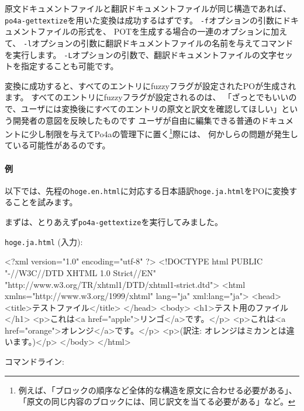 \documentclass[mingoth,a4paper]{jsarticle}
\begin{document}
原文ドキュメントファイルと翻訳ドキュメントファイルが同じ構造であれば、
\texttt{po4a-gettextize}を用いた変換は成功するはずです。
\texttt{-f}オプションの引数にドキュメントファイルの形式を、
POTを生成する場合の一連のオプションに加えて、
\texttt{-l}オプションの引数に翻訳ドキュメントファイルの名前を与えてコマンドを実行します。
\texttt{-L}オプションの引数で、翻訳ドキュメントファイルの文字セットを指定することも可能です。

変換に成功すると、すべてのエントリにfuzzyフラグが設定されたPOが生成されます。
すべてのエントリにfuzzyフラグが設定されるのは、
「ざっとでもいいので、ユーザには変換後にすべてのエントリの原文と訳文を確認してほしい」という開発者の意図を反映したものです
ユーザが自由に編集できる普通のドキュメントに少し制限を与えてPo4aの管理下に置く\footnote{例えば、「ブロックの順序など全体的な構造を原文に合わせる必要がある」、「原文の同じ内容のブロックには、同じ訳文を当てる必要がある」など。}際には、
何かしらの問題が発生している可能性があるのです。

\paragraph{例}
以下では、先程の\texttt{hoge.en.html}に対応する日本語訳\texttt{hoge.ja.html}をPOに変換することを試みます。

まずは、とりあえず\texttt{po4a-gettextize}を実行してみました。

\texttt{hoge.ja.html} (入力):

\begin{commandline}
<?xml version="1.0" encoding="utf-8" ?>
<!DOCTYPE html PUBLIC "-//W3C//DTD XHTML 1.0 Strict//EN"
"http://www.w3.org/TR/xhtml1/DTD/xhtml1-strict.dtd">
<html xmlns="http://www.w3.org/1999/xhtml" lang="ja" xml:lang="ja">
<head>
<title>テストファイル</title>
</head>
<body>
<h1>テスト用のファイル</h1>
<p>これは<a href="apple">リンゴ</a>です。</p>
<p>これは<a href="orange">オレンジ</a>です。</p>
<p>(訳注: オレンジはミカンとは違います。)</p>
</body>
</html>
\end{commandline}

コマンドライン:
\end{document}
